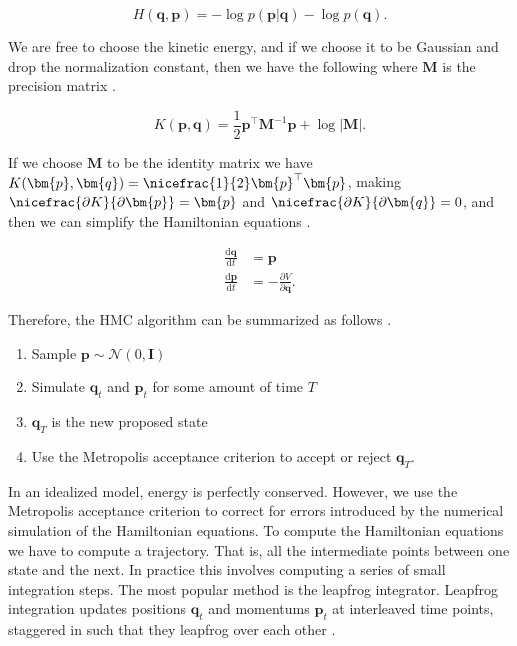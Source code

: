 \documentclass[../../../main.tex]{subfiles}
\begin{document}
\begin{equation}
H(\bm{q},\bm{p}) = -\log p(\bm{p}|\bm{q}) - \log p(\bm{q}).
\end{equation}

We are free to choose the kinetic energy, and if we choose it to be Gaussian and drop the normalization constant, then we have the following where $\bm{M}$ is the precision matrix \autocite{Martin2021}.

\begin{equation}
K(\bm{p},\bm{q}) = \frac{1}{2}\bm{p}^\top\bm{M}^{-1}\bm{p} + \log \left|\bm{M}\right|.
\end{equation}

If we choose $\bm{M}$ to be the identity matrix we have $K(\bm{p},\bm{q})=\nicefrac{1}{2}\bm{p}^\top\bm{p}$, making $\nicefrac{\partial K}{\partial \bm{p}}=\bm{p}$ and $\nicefrac{\partial K}{\partial \bm{q}}=0$, and then we can simplify the Hamiltonian equations \autocite{Martin2021}.

\begin{align}
\frac{\mathrm{d}\bm{q}}{\mathrm{d}t} &= \bm{p} \\
\frac{\mathrm{d}\bm{p}}{\mathrm{d}t} &= -\frac{\partial V}{\partial\bm{q}}.
\end{align}

Therefore, the HMC algorithm can be summarized as follows \autocite{Martin2021}.

\begin{enumerate}
\item Sample $\bm{p}\sim\mathcal{N}(0,\bm{I})$
\item Simulate $\bm{q}_t$ and $\bm{p}_t$ for some amount of time $T$
\item $\bm{q}_T$ is the new proposed state
\item Use the Metropolis acceptance criterion to accept or reject $\bm{q}_T$.
\end{enumerate}

In an idealized model, energy is perfectly conserved. However, we use the Metropolis acceptance criterion to correct for errors introduced by the numerical simulation of the Hamiltonian equations. To compute the Hamiltonian equations we have to compute a trajectory. That is, all the intermediate points between one state and the next. In practice this involves computing a series of small integration steps. The most popular method is the leapfrog integrator. Leapfrog integration updates positions $\bm{q}_t$ and momentums $\bm{p}_t$ at interleaved time points, staggered in such that they leapfrog over each other \autocite{Martin2021}.
\end{document}
